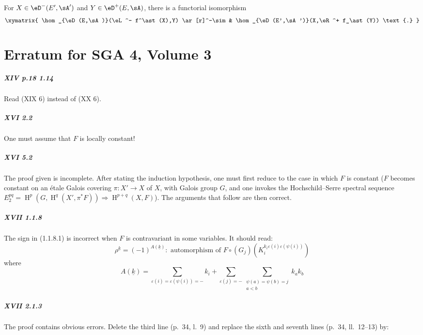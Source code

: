 \documentclass[12pt,oneside,english]{smfbook}
\DeclareMathOperator{\h}{H}
\begin{document}
For $X\in\eD^-(E',\sA')$ and $Y\in\eD^+(E,\sA)$, there is a functorial isomorphism
\[\xymatrix{
  \hom_{\eD(E,\sA)}(\eL^- f^\ast(X),Y) \ar[r]^-\sim
    & \hom_{\eD(E',\sA')}(X,\eR^+ f_\ast(Y)) \text{.}
}\]
\clearpage
\clearpage
\appendix
\chapter{Erratum for SGA 4, Volume 3}

\paragraph{XIV p.18 1.14}
Read (XIX 6) instead of (XX 6).

\paragraph{XVI 2.2}
One must assume that $F$ is locally constant!

\paragraph{XVI 5.2}
The proof given is incomplete. After stating the induction hypothesis, one must first reduce to the case in which $F$ is constant ($F$ becomes constant on an étale Galois covering $\pi:X'\to X$ of $X$, with Galois group $G$, and one invokes the Hochschild--Serre spectral sequence $E_2^{p q}=\h^p(G,\h^q(X',\pi^\ast F))\Rightarrow \h^{p+q}(X,F)$). The arguments that follow are then correct.

\paragraph{XVII 1.1.8}
The sign in (1.1.8.1) is incorrect when $F$ is contravariant in some variables. It should read:
\begin{equation*}\tag{1.1.8.1}
  \rho^{\underline k} = (-1)^{A(\underline k)}: \text{ automorphism of }
F\circ (G_j)\left(K_i^{k_i\varepsilon(i)\varepsilon(\psi(i))}\right)
\end{equation*}
where
\[
  A(\underline k) = \sum_{\varepsilon(i) = \varepsilon(\psi(i))=-} k_i + \sum_{\varepsilon(j)=-} \sum_{\substack{\psi(a)=\psi(b)=j \\ a<b}} k_a k_b
\]

\paragraph{XVII 2.1.3}
The proof contains obvious errors. Delete the third line (p.~34, l.~9) and replace the sixth and seventh lines (p.~34, ll.~12--13) by:
\end{document}
